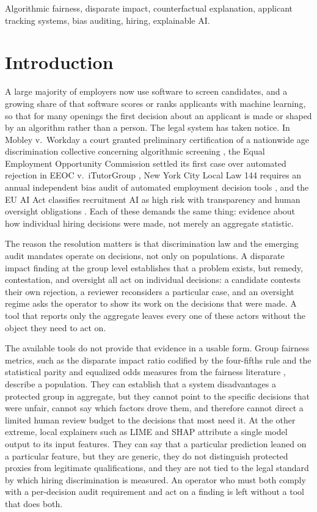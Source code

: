 \documentclass[conference]{IEEEtran}
\begin{document}
\begin{IEEEkeywords}
Algorithmic fairness, disparate impact, counterfactual explanation, applicant
tracking systems, bias auditing, hiring, explainable AI.
\end{IEEEkeywords}

\section{Introduction}
A large majority of employers now use software to screen candidates, and a growing
share of that software scores or ranks applicants with machine learning, so that for
many openings the first decision about an applicant is made or shaped by an algorithm
rather than a person. The legal
system has taken notice. In Mobley v.\ Workday a court granted preliminary
certification of a nationwide age discrimination collective concerning algorithmic
screening \cite{mobley}, the Equal Employment Opportunity Commission settled its
first case over automated rejection in EEOC v.\ iTutorGroup \cite{itutor},
New York City Local Law 144 requires an annual independent bias audit of automated
employment decision tools \cite{ll144}, and the EU AI Act classifies recruitment AI
as high risk with transparency and human oversight obligations \cite{euaiact}. Each
of these demands the same thing: evidence about how individual hiring decisions were
made, not merely an aggregate statistic.

The reason the resolution matters is that discrimination law and the emerging audit
mandates operate on decisions, not only on populations. A disparate impact finding at
the group level establishes that a problem exists, but remedy, contestation, and
oversight all act on individual decisions: a candidate contests their own rejection, a
reviewer reconsiders a particular case, and an oversight regime asks the operator to
show its work on the decisions that were made. A tool that reports only the aggregate
leaves every one of these actors without the object they need to act on.

The available tools do not provide that evidence in a usable form. Group fairness
metrics, such as the disparate impact ratio codified by the four-fifths rule
\cite{uniform} and the statistical parity and equalized odds measures from the
fairness literature \cite{feldman,hardt}, describe a population. They can establish
that a system disadvantages a protected group in aggregate, but they cannot point to
the specific decisions that were unfair, cannot say which factors drove them, and
therefore cannot direct a limited human review budget to the decisions that most
need it. At the other extreme, local explainers such as LIME \cite{lime} and SHAP
\cite{shap} attribute a single model output to its input features. They can say that
a particular prediction leaned on a particular feature, but they are generic, they do
not distinguish protected proxies from legitimate qualifications, and they are not
tied to the legal standard by which hiring discrimination is measured. An operator
who must both comply with a per-decision audit requirement and act on a finding is
left without a tool that does both.
\end{document}
